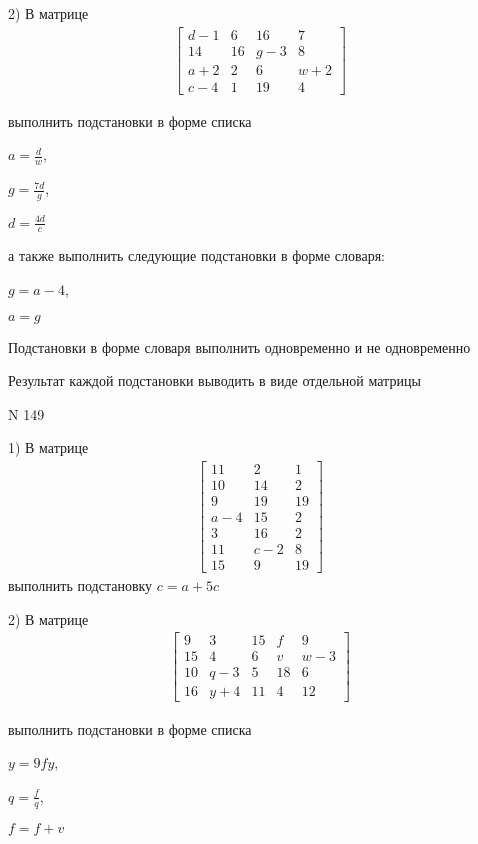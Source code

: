 \documentclass[11pt]{report}
\begin{document}
    2) В матрице
\begin{align*}
\left[\begin{matrix}d - 1 & 6 & 16 & 7\\14 & 16 & g - 3 & 8\\a + 2 & 2 & 6 & w + 2\\c - 4 & 1 & 19 & 4\end{matrix}\right]
\end{align*}

выполнить подстановки в форме списка

$a=\frac{d}{w}$,

$g=\frac{7 d}{g}$,

$d=\frac{4 d}{c}$

а также выполнить следующие подстановки в форме словаря:

$g=a - 4$,

$a=g$


    Подстановки в форме словаря выполнить одновременно и не одновременно


    Результат каждой подстановки выводить в виде отдельной матрицы

\newpage
N 149


    1) В матрице
\begin{align*}
\left[\begin{matrix}11 & 2 & 1\\10 & 14 & 2\\9 & 19 & 19\\a - 4 & 15 & 2\\3 & 16 & 2\\11 & c - 2 & 8\\15 & 9 & 19\end{matrix}\right]
\end{align*}
выполнить подстановку $c=a + 5 c$


    2) В матрице
\begin{align*}
\left[\begin{matrix}9 & 3 & 15 & f & 9\\15 & 4 & 6 & v & w - 3\\10 & q - 3 & 5 & 18 & 6\\16 & y + 4 & 11 & 4 & 12\end{matrix}\right]
\end{align*}

выполнить подстановки в форме списка

$y=9 f y$,

$q=\frac{f}{q}$,

$f=f + v$
\end{document}
